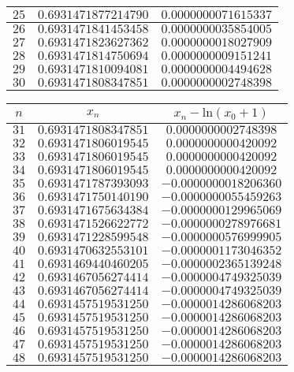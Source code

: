 \documentclass{article}
\begin{document}
\begin{enumerate}
\begin{enumerate}
\begin{table}[H]
\begin{tabular}{ |c|c|c| }
 \hline
$25$ & $0.6931471877214790$ & $0.0000000071615337$ \\
 \hline
$26$ & $0.6931471841453458$ & $0.0000000035854005$ \\
 \hline
$27$ & $0.6931471823627362$ & $0.0000000018027909$ \\
 \hline
$28$ & $0.6931471814750694$ & $0.0000000009151241$ \\
 \hline
$29$ & $0.6931471810094081$ & $0.0000000004494628$ \\
 \hline
$30$ & $0.6931471808347851$ & $0.0000000002748398$ \\
 \hline
\end{tabular}
\quad
\begin{tabular}{ |c|c|c| }
\hline
$n$ & $x_n$ & $x_n - \mbox{ln}(x_0+1)$ \\
\hline
$31$ & $0.6931471808347851$ & $0.0000000002748398$ \\
 \hline
$32$ & $0.6931471806019545$ & $0.0000000000420092$ \\
 \hline
$33$ & $0.6931471806019545$ & $0.0000000000420092$ \\
 \hline
$34$ & $0.6931471806019545$ & $0.0000000000420092$ \\
 \hline
$35$ & $0.6931471787393093$ & $-0.0000000018206360$ \\
 \hline
$36$ & $0.6931471750140190$ & $-0.0000000055459263$ \\
 \hline
$37$ & $0.6931471675634384$ & $-0.0000000129965069$ \\
 \hline
$38$ & $0.6931471526622772$ & $-0.0000000278976681$ \\
 \hline
$39$ & $0.6931471228599548$ & $-0.0000000576999905$ \\
 \hline
$40$ & $0.6931470632553101$ & $-0.0000001173046352$ \\
 \hline
$41$ & $0.6931469440460205$ & $-0.0000002365139248$ \\
 \hline
$42$ & $0.6931467056274414$ & $-0.0000004749325039$ \\
 \hline
$43$ & $0.6931467056274414$ & $-0.0000004749325039$ \\
 \hline
$44$ & $0.6931457519531250$ & $-0.0000014286068203$ \\
 \hline
$45$ & $0.6931457519531250$ & $-0.0000014286068203$ \\
 \hline
$46$ & $0.6931457519531250$ & $-0.0000014286068203$ \\
 \hline
$47$ & $0.6931457519531250$ & $-0.0000014286068203$ \\
 \hline
$48$ & $0.6931457519531250$ & $-0.0000014286068203$ \\

\end{tabular}
\end{table}
\end{enumerate}
\end{enumerate}
\end{document}
